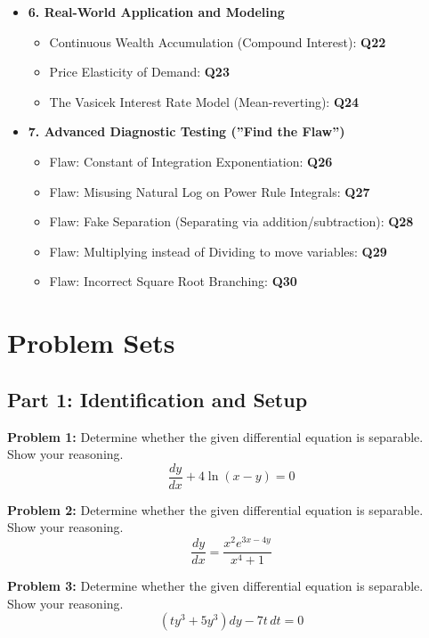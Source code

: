 \documentclass[11pt]{article}
\begin{document}
\begin{itemize}
    \item \textbf{6. Real-World Application and Modeling}
    \begin{itemize}
        \item Continuous Wealth Accumulation (Compound Interest): \textbf{Q22}
        \item Price Elasticity of Demand: \textbf{Q23}
        \item The Vasicek Interest Rate Model (Mean-reverting): \textbf{Q24}
    \end{itemize}
    
    \item \textbf{7. Advanced Diagnostic Testing (''Find the Flaw'')}
    \begin{itemize}
        \item Flaw: Constant of Integration Exponentiation: \textbf{Q26}
        \item Flaw: Misusing Natural Log on Power Rule Integrals: \textbf{Q27}
        \item Flaw: Fake Separation (Separating via addition/subtraction): \textbf{Q28}
        \item Flaw: Multiplying instead of Dividing to move variables: \textbf{Q29}
        \item Flaw: Incorrect Square Root Branching: \textbf{Q30}
    \end{itemize}
\end{itemize}

\newpage

\section{Problem Sets}

\subsection*{Part 1: Identification and Setup}
\textbf{Problem 1:} Determine whether the given differential equation is separable. Show your reasoning.
\[ \frac{dy}{dx} + 4\ln(x-y) = 0 \]

\textbf{Problem 2:} Determine whether the given differential equation is separable. Show your reasoning.
\[ \frac{dy}{dx} = \frac{x^2 e^{3x-4y}}{x^4 + 1} \]

\textbf{Problem 3:} Determine whether the given differential equation is separable. Show your reasoning.
\[ (ty^3 + 5y^3)dy - 7t \, dt = 0 \]
\end{document}
